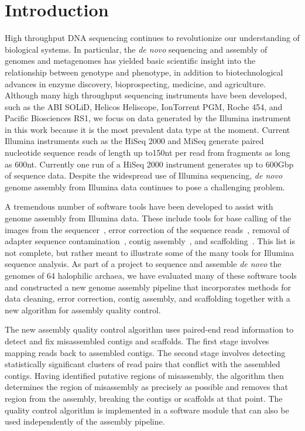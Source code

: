 \documentclass{bioinfo}
\begin{document}
\section{Introduction}
High throughput DNA sequencing continues to revolutionize our understanding of biological systems. In particular,
the \textit{de novo} sequencing and assembly of genomes and metagenomes has yielded basic scientific insight into 
the relationship between genotype and phenotype,
in addition to biotechnological advances in enzyme discovery, bioprospecting, medicine, and agriculture.  
Although many high throughput sequencing instruments have been developed, such as the ABI SOLiD, Helicos Heliscope, IonTorrent PGM, Roche 454, and 
Pacific Biosciences RS1, we focus on data generated by the Illumina instrument in this work because it is the most prevalent data type at the moment. 
Current Illumina instruments such as the HiSeq 2000 and MiSeq generate paired nucleotide sequence reads of length up to150nt per read from fragments  
as long as 600nt. Currently one run of a HiSeq 2000 instrument generates up to 600Gbp of sequence data.  Despite the widespread use of Illumina  
sequencing, \emph{de novo} genome assembly from Illumina data continues to pose a challenging problem.



A tremendous number of software tools have been developed to assist with genome assembly from Illumina data.
These include tools for base calling of the images from the sequencer~\citep{BayesCall,Kircher2009},
error correction of the sequence reads~\citep{Kelley2010,Kao2011}, removal of adapter sequence contamination~\citep{Lassmann2009},
contig assembly~\citep{Warren2007,Chaisson2008}, and scaffolding~\citep{Koren2011,Boetzer2011,Dayarian2010}.
This list is not complete, but rather meant to illustrate some of the many tools for Illumina sequence analysis.
As part of a project to sequence and assemble \textit{de novo} the genomes of 64 halophilic archaea, we have
evaluated many of these software tools and constructed a new genome assembly pipeline that incorporates
methods for data cleaning, error correction, contig assembly, and scaffolding together with a new algorithm
for assembly quality control. 

The new assembly quality control algorithm uses paired-end read information
to detect and fix misassembled contigs and scaffolds. The first stage involves mapping reads back to assembled contigs.
The second stage involves detecting statistically significant clusters of read pairs that conflict with the
assembled contigs. Having identified putative regions of misassembly, the algorithm then determines the 
region of misassembly as precisely as possible and removes that region from the assembly, breaking the contigs
or scaffolds at that point. The quality control algorithm is implemented in a software module that can also be used 
independently of the assembly pipeline.
\end{document}
